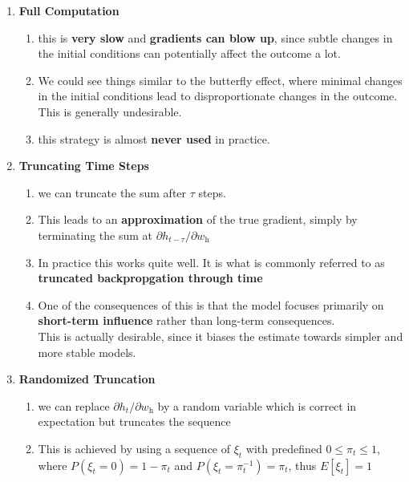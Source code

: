 \begin{enumerate}[itemsep=0.2cm]
    \item \textbf{Full Computation}
    \begin{enumerate}
        \item this is \textbf{very slow} and \textbf{gradients can blow up}, since subtle changes in the initial conditions can potentially affect the outcome a lot. 
        
        \item We could see things similar to the butterfly effect, where minimal changes in the initial conditions lead to disproportionate changes in the outcome. This is generally undesirable.  
        
        \item this strategy is almost \textbf{never used} in practice.

    \end{enumerate}

    \item \textbf{Truncating Time Steps}
    \begin{enumerate}
        \item we can truncate the sum after $\tau$ steps.

        \item This leads to an \textbf{approximation} of the true gradient, simply by terminating the sum at $\partial h_{t-\tau}/\partial w_\textrm{h}$

        \item In practice this works quite well. It is what is commonly referred to as \textbf{truncated backpropgation through time}

        \item One of the consequences of this is that the model focuses primarily on \textbf{short-term influence} rather than long-term consequences.\\
        This is actually desirable, since it biases the estimate towards simpler and more stable models.
    \end{enumerate}

    \item \textbf{Randomized Truncation}
    \begin{enumerate}
        \item we can replace $\partial h_t/\partial w_\textrm{h}$ by a random variable which is correct in expectation but truncates the sequence

        \item This is achieved by using a sequence of $\xi_t$ with predefined $0 \leq \pi_t \leq 1$, where $P(\xi_t = 0) = 1-\pi_t$ and $P(\xi_t = \pi_t^{-1}) = \pi_t$, thus $E[\xi_t] = 1$


\end{enumerate}
\end{enumerate}

